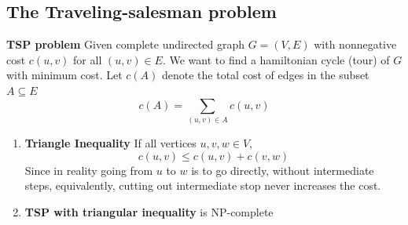 \documentclass[11pt]{article}
\begin{document}
\subsection*{The Traveling-salesman problem}


\begin{defn*}
    \textbf{TSP problem} Given complete undirected graph $G= (V,E)$  with nonnegative cost $c(u,v)$ for all $(u,v)\in E$. We want to find a hamiltonian cycle (tour) of $G$ with minimum cost. Let $c(A)$ denote the total cost of edges in the subset $A\subseteq E$ 
    \[
        c(A) = \sum_{(u,v)\in A} c(u,v)
    \]
    \begin{enumerate}
        \item \textbf{Triangle Inequality} If all vertices $u,v,w\in V$, 
        \[
            c(u,v) \leq c(u,v) + c(v,w)
        \]
        Since in reality going from $u$ to $w$ is to go directly, without intermediate steps, equivalently, cutting out intermediate stop never increases the cost.
        \item \textbf{TSP with triangular inequality} is NP-complete
    \end{enumerate}
\end{defn*}
\end{document}
